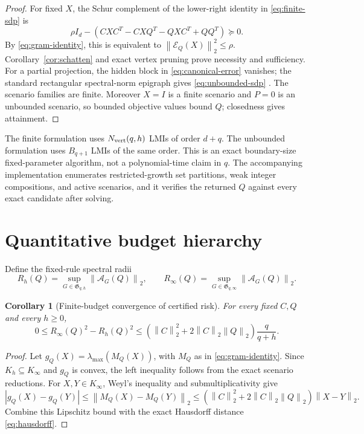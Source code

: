 \documentclass[journal,10pt]{IEEEtran}
\newtheorem{corollary}[theorem]{Corollary}
\theoremstyle{definition}
\theoremstyle{remark}
\newcommand{\cE}{\mathcal E}
\newcommand{\cA}{\mathcal A}
\newcommand{\fG}{\mathfrak G}
\newcommand{\norm}[1]{\left\lVert #1\right\rVert}
\begin{document}
\begin{proof}
For fixed $X$, the Schur complement of the lower-right identity in
\eqref{eq:finite-sdp} is
\[
  \rho I_d-
  \left(CXC^T-CXQ^T-QXC^T+QQ^T\right)\succeq0.
\]
By \eqref{eq:gram-identity}, this is equivalent to
$\norm{\cE_Q(X)}_2^2\leq\rho$.  Corollary~\ref{cor:schatten} and exact vertex
pruning prove necessity and sufficiency.  For a partial projection, the
hidden block in \eqref{eq:canonical-error} vanishes; the standard rectangular
spectral-norm epigraph gives \eqref{eq:unbounded-sdp}
\cite{boyd2004}.  The scenario families
are finite.  Moreover $X=I$ is a finite scenario and $P=0$ is an unbounded
scenario, so bounded objective values bound $Q$; closedness gives attainment.
\end{proof}

The finite formulation uses $N_{\rm vert}(q,h)$ LMIs of order $d+q$.  The
unbounded formulation uses $B_{q+1}$ LMIs of the same order.  This is an exact
boundary-size fixed-parameter algorithm, not a polynomial-time claim in $q$.
The accompanying implementation enumerates restricted-growth set partitions,
weak integer compositions, and active scenarios, and it verifies the returned
$Q$ against every exact candidate after solving.

\section{Quantitative budget hierarchy}

Define the fixed-rule spectral radii
\[
  R_h(Q)=\sup_{G\in\fG_{q,h}}\norm{\cA_G(Q)}_2,
  \qquad
  R_\infty(Q)=\sup_{G\in\fG_{q,\infty}}\norm{\cA_G(Q)}_2.
\]

\begin{corollary}[Finite-budget convergence of certified risk]
\label{cor:rate}
For every fixed $C,Q$ and every $h\geq0$,
\begin{equation}
  0\leq R_\infty(Q)^2-R_h(Q)^2
  \leq
  \left(\norm{C}_2^2+2\norm{C}_2\norm{Q}_2\right)
  \frac{q}{q+h}.
  \label{eq:risk-rate}
\end{equation}
\end{corollary}

\begin{proof}
Let $g_Q(X)=\lambda_{\max}(M_Q(X))$, with $M_Q$ as in
\eqref{eq:gram-identity}.  Since $K_h\subseteq K_\infty$ and $g_Q$ is convex,
the left inequality follows from the exact scenario reductions.  For
$X,Y\in K_\infty$, Weyl's inequality and submultiplicativity give
\[
 |g_Q(X)-g_Q(Y)|
 \leq\norm{M_Q(X)-M_Q(Y)}_2
 \leq(\norm{C}_2^2+2\norm{C}_2\norm{Q}_2)\norm{X-Y}_2.
\]
Combine this Lipschitz bound with the exact Hausdorff distance
\eqref{eq:hausdorff}.
\end{proof}
\end{document}

